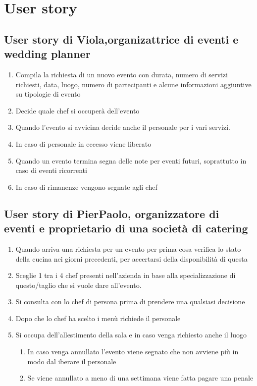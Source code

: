 \section{User story}

\subsection{User story di Viola,organizattrice di eventi e wedding planner}
\begin{enumerate}
  \item Compila la richiesta di un nuovo evento con durata, numero di servizi richiesti, data, luogo, numero di partecipanti e alcune informazioni aggiuntive su tipologie di evento
  \item Decide quale chef si occuperà dell'evento 
  \item Quando l'evento si avvicina decide anche il personale per i vari servizi.
  \item In caso di personale in eccesso  viene liberato 
  \item Quando un evento termina segna delle note per eventi futuri, soprattutto in caso di eventi ricorrenti
  \item In caso di rimanenze vengono segnate agli chef
\end{enumerate}

\subsection{User story di PierPaolo, organizzatore di eventi e proprietario di una società di catering}
\begin{enumerate}
  \item  Quando arriva una richiesta per un evento per prima cosa verifica lo stato della cucina nei giorni precedenti, per accertarsi della disponibilità di questa 
  \item Sceglie 1 tra i 4 chef presenti nell'azienda in base alla specializzazione di questo/taglio che si vuole dare all'evento.
  \item Si consulta con lo chef di persona prima di prendere una qualsiasi decisione
  \item Dopo che lo chef ha scelto i menù richiede il personale 
  \item Si occupa dell'allestimento della sala e in caso venga richiesto anche il luogo
  \begin{enumerate}
  \item In caso venga annullato l'evento viene segnato che non avviene più in modo dal iberare il personale
 \item Se viene annullato a meno di una settimana viene fatta pagare una penale
  \end{enumerate}
\end{enumerate}

